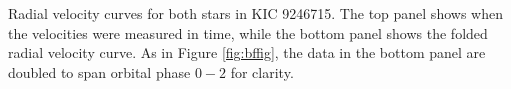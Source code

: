 \label{fig:rvfig} Radial velocity curves for both stars in KIC 9246715. The top panel shows when the velocities were measured in time, while the bottom panel shows the folded radial velocity curve. As in Figure \ref{fig:bffig}, the data in the bottom panel are doubled to span orbital phase $0-2$ for clarity.